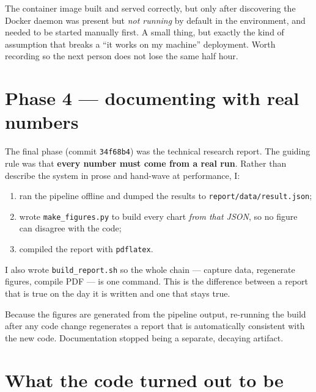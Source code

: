 \documentclass[11pt,a4paper]{article}
\newcommand{\code}[1]{\texttt{\small #1}}
\begin{document}
\begin{warstory}
The container image built and served correctly, but only after discovering the
Docker daemon was present but \emph{not running} by default in the environment,
and needed to be started manually first. A small thing, but exactly the kind of
assumption that breaks a ``it works on my machine'' deployment. Worth recording
so the next person does not lose the same half hour.
\end{warstory}

\section{Phase 4 --- documenting with real numbers}

The final phase (commit \texttt{34f68b4}) was the technical research report. The
guiding rule was that \textbf{every number must come from a real run}. Rather
than describe the system in prose and hand-wave at performance, I:

\begin{enumerate}[leftmargin=1.4em,itemsep=3pt]
  \item ran the pipeline offline and dumped the results to
    \code{report/data/result.json};
  \item wrote \code{make\_figures.py} to build every chart \emph{from that
    JSON}, so no figure can disagree with the code;
  \item compiled the report with \code{pdflatex}.
\end{enumerate}

I also wrote \code{build\_report.sh} so the whole chain --- capture data,
regenerate figures, compile PDF --- is one command. This is the difference
between a report that is true on the day it is written and one that stays true.

\begin{lessonbox}
Because the figures are generated from the pipeline output, re-running the build
after any code change regenerates a report that is automatically consistent with
the new code. Documentation stopped being a separate, decaying artifact.
\end{lessonbox}

\section{What the code turned out to be}
\end{document}
